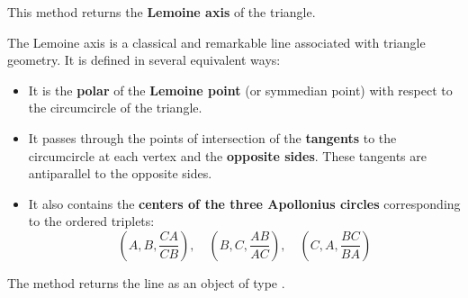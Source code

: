 This method returns the \textbf{Lemoine axis} of the triangle.

\medskip
\noindent
The Lemoine axis is a classical and remarkable line associated with triangle geometry. It is defined in several equivalent ways:
\begin{itemize}
  \item It is the \textbf{polar} of the \textbf{Lemoine point} (or symmedian point) with respect to the circumcircle of the triangle.
  \item It passes through the points of intersection of the \textbf{tangents} to the circumcircle at each vertex and the \textbf{opposite sides}. These tangents are antiparallel to the opposite sides.
  \item It also contains the \textbf{centers of the three Apollonius circles} corresponding to the ordered triplets:
  \[
    (A, B, \frac{CA}{CB}), \quad (B, C, \frac{AB}{AC}), \quad (C, A, \frac{BC}{BA})
  \]
\end{itemize}

\noindent
The method  returns the line as an object of type .

\vspace{1em}

\begin{minipage}{.5\textwidth}
\begin{center}
\end{center}

\end{minipage}
\begin{minipage}{.5\textwidth}
\begin{tkzexample}
\end{tkzexample}
\end{minipage}

